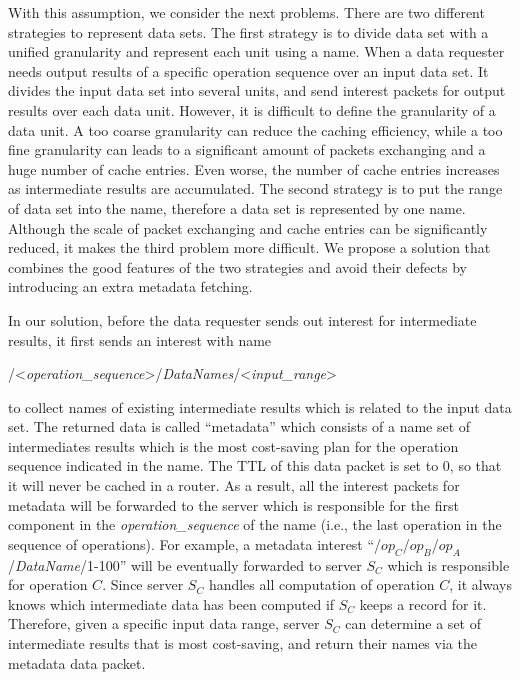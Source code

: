\documentclass[journal]{IEEEtran}
\begin{document}
With this assumption, we consider the next problems.  There are two different
strategies to represent data sets.  The first strategy is to divide data set
with a unified granularity and represent each unit using a name.  When a data
requester needs output results of a specific operation sequence over an input
data set.  It divides the input data set into several units, and send {\sc
  interest} packets for output results over each data unit.  However, it is
difficult to define the granularity of a data unit.  A too coarse granularity
can reduce the caching efficiency, while a too fine granularity can leads to a
significant amount of packets exchanging and a huge number of cache entries.
Even worse, the number of cache entries increases as intermediate results are
accumulated.  The second strategy is to put the range of data set into the name,
therefore a data set is represented by one name.  Although the scale of packet
exchanging and cache entries can be significantly reduced, it makes the third
problem more difficult.  We propose a solution that combines the good features
of the two strategies and avoid their defects by introducing an extra metadata
fetching.  

In our solution, before the data requester sends out {\sc interest}
for intermediate results, it first sends an {\sc interest} with name 
\begin{center}
/\textless{\it operation\_sequence}\textgreater/{\it DataNames}/\textless{\it input\_range}\textgreater
\end{center}
to collect names of existing intermediate results which is related to the input
data set.  The returned {\sc data} is called ``metadata'' which consists of a
name set of intermediates results which is the most cost-saving plan for the
operation sequence indicated in the name.  The TTL of this {\sc data} packet is
set to 0, so that it will never be cached in a router.  As a result, all the
{\sc interest} packets for metadata will be forwarded to the server which is
responsible for the first component in the {\it operation\_sequence} of the name
(i.e., the last operation in the sequence of operations).  For example, a
metadata {\sc interest} ``/$op_C$/$op_B$/$op_A$/{\it DataName}/1-100'' will
be eventually forwarded to server $S_C$ which is responsible for operation $C$.
Since server $S_C$ handles all computation of operation $C$, it always knows
which intermediate data has been computed if $S_C$ keeps a record for it.
Therefore, given a specific input data range, server $S_C$ can determine a set
of intermediate results that is most cost-saving, and return their names via the
metadata {\sc data} packet.  
\end{document}
